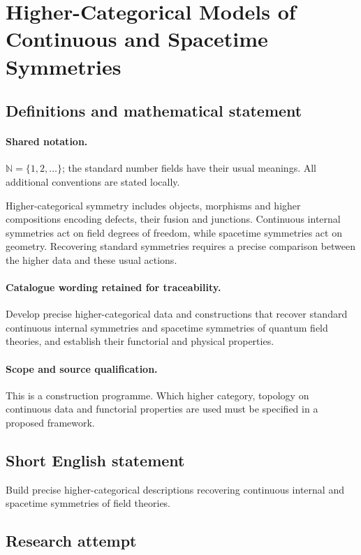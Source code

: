 \documentclass[11pt]{article}
\begin{document}
\section{Higher-Categorical Models of Continuous and Spacetime Symmetries}\label{statement}

\subsection{Definitions and mathematical statement}

\paragraph{Shared notation.}$\mathbb N=\{1,2,\ldots\}$; the standard number fields have their usual meanings. All additional conventions are stated locally.


Higher-categorical symmetry includes objects, morphisms and higher compositions encoding defects, their fusion and junctions. Continuous internal symmetries act on field degrees of freedom, while spacetime symmetries act on geometry. Recovering standard symmetries requires a precise comparison between the higher data and these usual actions.

\paragraph{Catalogue wording retained for traceability.}
Develop precise higher-categorical data and constructions that recover standard continuous internal symmetries and spacetime symmetries of quantum field theories, and establish their functorial and physical properties.

\paragraph{Scope and source qualification.}This is a construction programme. Which higher category, topology on continuous data and functorial properties are used must be specified in a proposed framework.
\subsection{Short English statement}
Build precise higher-categorical descriptions recovering continuous internal and spacetime symmetries of field theories.
\subsection{Research attempt}
\end{document}
